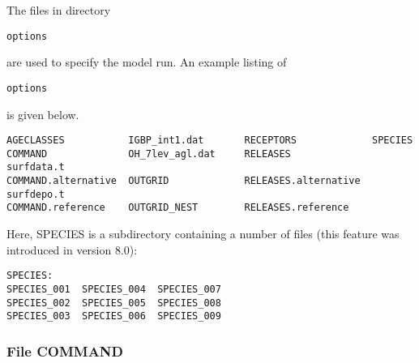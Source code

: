\documentclass{egu}            %
\begin{document}
The files in directory \begin{footnotesize}\verb|options|\end{footnotesize} are used to specify the model run.
An example listing of \begin{footnotesize}\verb|options|\end{footnotesize} is given below.
\begin{footnotesize}\begin{verbatim}
AGECLASSES           IGBP_int1.dat       RECEPTORS             SPECIES
COMMAND              OH_7lev_agl.dat     RELEASES              surfdata.t
COMMAND.alternative  OUTGRID             RELEASES.alternative  surfdepo.t
COMMAND.reference    OUTGRID_NEST        RELEASES.reference              
\end{verbatim}\end{footnotesize}

Here, SPECIES is a subdirectory containing a number of files (this feature was introduced in version 8.0):
\begin{footnotesize}\begin{verbatim}
SPECIES:
SPECIES_001  SPECIES_004  SPECIES_007
SPECIES_002  SPECIES_005  SPECIES_008
SPECIES_003  SPECIES_006  SPECIES_009
\end{verbatim}\end{footnotesize}

\subsubsection{File COMMAND}
\end{document}
